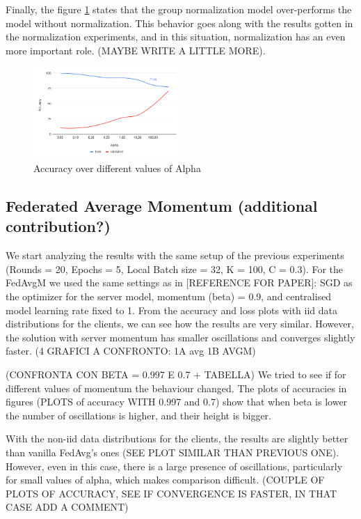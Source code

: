 \documentclass[twocolumn]{article}
\begin{document}
Finally, the figure \ref{AccAlpha} states that the group normalization model over-performs the model without normalization. This behavior goes along with the results gotten in the normalization experiments, and in this situation, normalization has an even more important role. (MAYBE WRITE A LITTLE MORE).


\begin{figure}
    \centering
    \includegraphics[width=0.5\textwidth,height=.3\textheight]{alphaAccuracy.png}
    \caption{Accuracy over different values of Alpha}
    \label{AccAlpha} 
\end{figure}


\subsection{Federated Average Momentum (additional contribution?)}
We start analyzing the results with the same setup of the previous experiments (Rounds = 20, Epochs = 5, Local Batch size = 32, K = 100, C = 0.3).
For the FedAvgM we used the same settings as in [REFERENCE FOR PAPER]: SGD as the optimizer for the server model,  momentum (beta) = 0.9, and centralised model learning rate fixed to 1.
From the accuracy and loss plots with iid data distributions for the clients, we can see how the results are very similar. However, the solution with server momentum has smaller oscillations and converges slightly faster. 
(4 GRAFICI A CONFRONTO: 1A avg 1B AVGM)

(CONFRONTA CON BETA = 0.997 E 0.7 + TABELLA)
We tried to see if for different values of momentum the behaviour changed. The plots of accuracies in figures (PLOTS of accuracy WITH 0.997 and 0.7) show that when beta is lower the number of oscillations is higher, and their height is bigger.

With the non-iid data distributions for the clients, the results are slightly better than vanilla FedAvg's ones (SEE PLOT SIMILAR THAN PREVIOUS ONE). However, even in this case, there is a large presence of oscillations, particularly for small values of alpha, which makes comparison difficult.
(COUPLE OF PLOTS OF ACCURACY, SEE IF CONVERGENCE IS FASTER, IN THAT CASE ADD A COMMENT)
\end{document}
